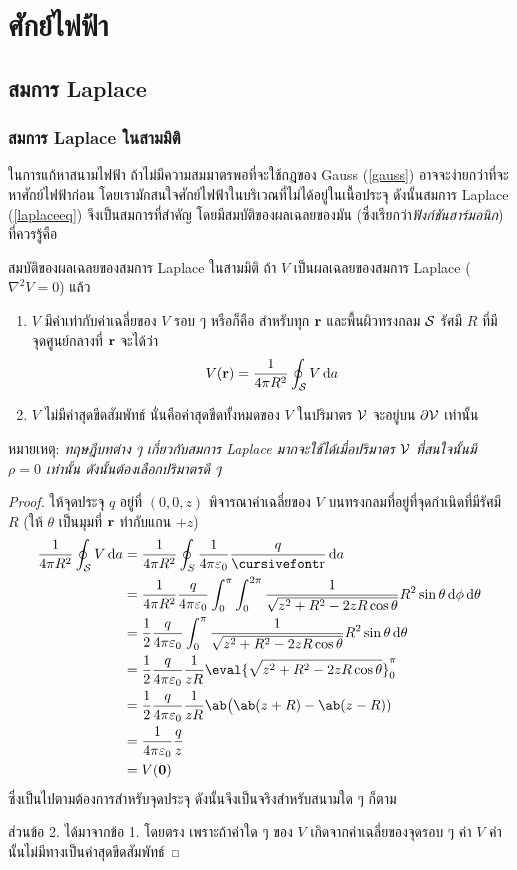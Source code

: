 \chapter{ศักย์ไฟฟ้า}
\section{สมการ Laplace}
\subsection{สมการ Laplace ในสามมิติ}
ในการแก้หาสนามไฟฟ้า ถ้าไม่มีความสมมาตรพอที่จะใช้กฎของ Gauss (\ref{gauss}) อาจจะง่ายกว่าที่จะหาศักย์ไฟฟ้าก่อน โดยเรามักสนใจศักย์ไฟฟ้าในบริเวณที่ไม่ได้อยู่ในเนื้อประจุ ดังนั้นสมการ Laplace (\ref{laplaceeq}) จึงเป็นสมการที่สำคัญ โดยมีสมบัติของผลเฉลยของมัน (ซึ่งเรียกว่า\emph{ฟังก์ชันฮาร์มอนิก}) ที่ควรรู้คือ
\begin{lawbox}{สมบัติของผลเฉลยของสมการ Laplace ในสามมิติ}
    ถ้า $V$ เป็นผลเฉลยของสมการ Laplace ($\nabla^2V=0$) แล้ว
    \begin{enumerate}
        \item $V$ มีค่าเท่ากับค่าเฉลี่ยของ $V$ รอบ ๆ หรือก็คือ สำหรับทุก $\mathbf{r}$ และพื้นผิวทรงกลม $\mathcal{S}$ รัศมี $R$ ที่มีจุดศูนย์กลางที่ $\mathbf{r}$ จะได้ว่า
        \begin{equation}
            V(\vb{r})=\frac{1}{4\pi R^2}\oint_\sur V\odif{a}
        \end{equation}
        \item $V$ ไม่มีค่าสุดขีดสัมพัทธ์ นั่นคือค่าสุดขีดทั้งหมดของ $V$ ในปริมาตร $\mathcal{V}$ จะอยู่บน $\partial\mathcal{V}$ เท่านั้น
    \end{enumerate}
\end{lawbox}
หมายเหตุ: \emph{ทฤษฎีบทต่าง ๆ เกี่ยวกับสมการ Laplace มากจะใช้ได้เมื่อปริมาตร $\mathcal{V}$ ที่สนใจนั้นมี $\rho=0$ เท่านั้น ดังนั้นต้องเลือกปริมาตรดี ๆ}
\begin{proof}
    ให้จุดประจุ $q$ อยู่ที่ $(0,0,z)$ พิจารณาค่าเฉลี่ยของ $V$ บนทรงกลมที่อยู่ที่จุดกำเนิดที่มีรัศมี $R$ (ให้ $\theta$ เป็นมุมที่ $\mathbf{r}$ ทำกับแกน $+z$)
    {\allowdisplaybreaks
    \begin{align*}
        \frac{1}{4\pi R^2}\oint_\sur V\odif{a}&=\frac{1}{4\pi R^2}\oint_S\kem\frac{q}{\nrr}\odif{a}\\
        &=\frac{1}{4\pi R^2}\frac{q}{4\pi\eps_0}\int_0^\pi\int_0^{2\pi}\frac{1}{\sqrt{z^2+R^2-2zR\cos\theta}}R^2\sin\theta\odif{\phi}\odif{\theta}\\
        &=\frac{1}{2}\frac{q}{4\pi\eps_0}\int_0^\pi\frac{1}{\sqrt{z^2+R^2-2zR\cos\theta}}R^2\sin\theta\odif{\theta}\\
        &=\frac{1}{2}\frac{q}{4\pi\eps_0}\frac{1}{zR}\eval{\sqrt{z^2+R^2-2zR\cos\theta}}_0^\pi\\
        &=\frac{1}{2}\frac{q}{4\pi\eps_0}\frac{1}{zR}\ab\big(\ab(z+R)-\ab(z-R))\\
        &=\kem\frac{q}{z}\\
        &=V(\vb{0})
    \end{align*}
    }
    ซึ่งเป็นไปตามต้องการสำหรับจุดประจุ ดังนั้นจึงเป็นจริงสำหรับสนามใด ๆ ก็ตาม
    
    ส่วนข้อ 2. ได้มาจากข้อ 1. โดยตรง เพราะถ้าค่าใด ๆ ของ $V$ เกิดจากค่าเฉลี่ยของจุดรอบ ๆ ค่า $V$ ค่านั้นไม่มีทางเป็นค่าสุดขีดสัมพัทธ์
\end{proof}
